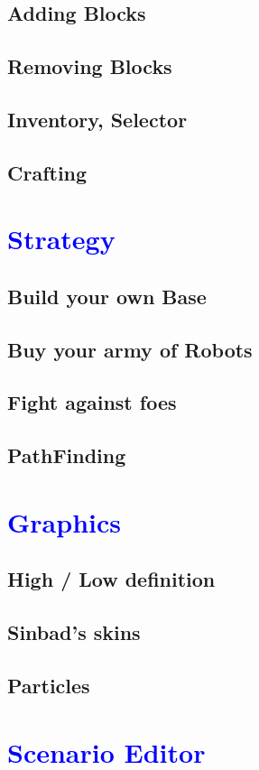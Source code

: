 \documentclass[article]{report}         %
\begin{document}
      \section{Adding Blocks}
      \section{Removing Blocks}
      \section{Inventory, Selector}
      \section{Crafting}
		\chapter{\textcolor{blue}{Strategy}}
      \section{Build your own Base}
      \section{Buy your army of Robots}
      \section{Fight against foes}
      \section{PathFinding}
		\chapter{\textcolor{blue}{Graphics}}
      \section{High / Low definition}
      \section{Sinbad's skins}
      \section{Particles}
		\chapter{\textcolor{blue}{Scenario Editor}}
\end{document}
